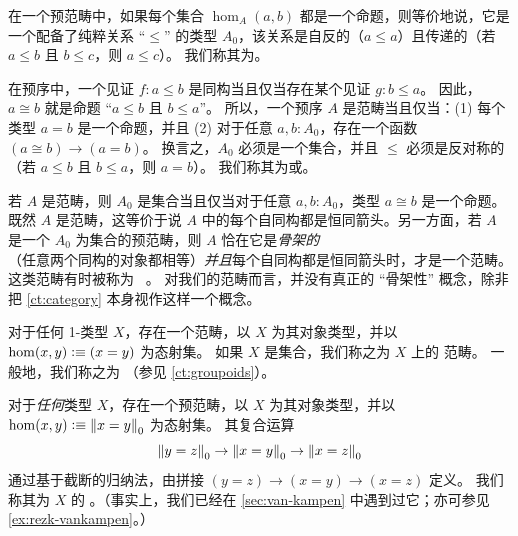 \begin{eg}\label{ct:orders}
  在一个预范畴中，如果每个集合 $\hom_A(a,b)$ 都是一个命题，则等价地说，它是一个配备了纯粹关系 ``$\le$'' 的类型 $A_0$，该关系是自反的（$a\le a$）且传递的（若 $a\le b$ 且 $b\le c$，则 $a\le c$）。
  我们称其为。

  在预序中，一个见证 $f: a\le b$ 是同构当且仅当存在某个见证 $g: b\le a$。
  因此，$a\cong b$ 就是命题 ``$a\le b$ 且 $b\le a$''。
  所以，一个预序 $A$ 是范畴当且仅当：(1) 每个类型 $a=b$ 是一个命题，并且 (2) 对于任意 $a,b:A_0$，存在一个函数 $(a\cong b) \to (a=b)$。
  换言之，$A_0$ 必须是一个集合，并且 $\le$ 必须是反对称的（若 $a\le b$ 且 $b\le a$，则 $a=b$）。
  我们称其为或。
\end{eg}

\begin{eg}\label{ct:gaunt}
  若 $A$ 是范畴，则 $A_0$ 是集合当且仅当对于任意 $a,b:A_0$，类型 $a\cong b$ 是一个命题。
  既然 $A$ 是范畴，这等价于说 $A$ 中的每个自同构都是恒同箭头。另一方面，若 $A$ 是一个 $A_0$ 为集合的预范畴，则 $A$ 恰在它是\emph{骨架的}（任意两个同构的对象都相等）\emph{并且}每个自同构都是恒同箭头时，才是一个范畴。
  这类范畴有时被称为 ~\cite{bsp12infncats}。
  对我们的范畴而言，并没有真正的 ``骨架性'' 概念，除非把 \cref{ct:category} 本身视作这样一个概念。
\end{eg}

\begin{eg}\label{ct:discrete}
  对于任何 1-类型 $X$，存在一个范畴，以 $X$ 为其对象类型，并以 $\hom(x,y) \vcentcolon\equiv (x=y)$ 为态射集。
  如果 $X$ 是集合，我们称之为 $X$ 上的
  范畴。
  一般地，我们称之为
  （参见 \cref{ct:groupoids}）。
\end{eg}

\begin{eg}\label{ct:fundgpd}
  对于\emph{任何}类型 $X$，存在一个预范畴，以 $X$ 为其对象类型，并以 $\hom(x,y) \vcentcolon\equiv \mathopen{}\left\Vert x=y\right\Vert_{0}\mathclose{}$ 为态射集。
  其复合运算
  \[ \mathopen{}\left\Vert y=z\right\Vert_{0}\mathclose{} \to \mathopen{}\left\Vert x=y\right\Vert_{0}\mathclose{} \to \mathopen{}\left\Vert x=z\right\Vert_{0}\mathclose{} \]
  通过基于截断的归纳法，由拼接 $(y=z)\to(x=y)\to(x=z)$ 定义。
  我们称其为 $X$ 的
  。（事实上，我们已经在 \cref{sec:van-kampen} 中遇到过它；亦可参见 \cref{ex:rezk-vankampen}。）
\end{eg}

